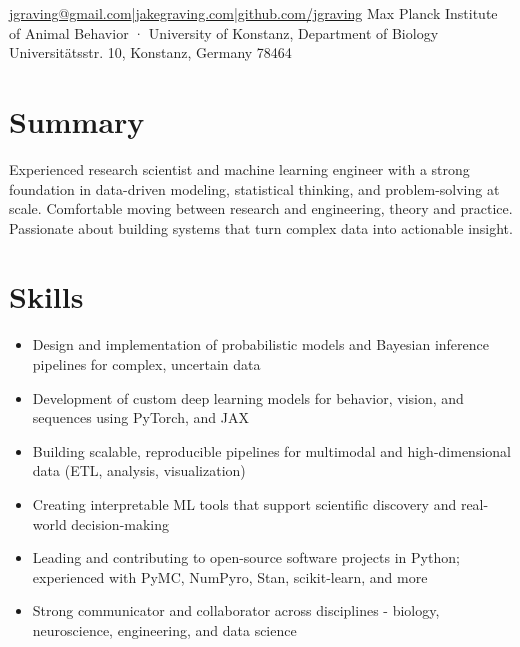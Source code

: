 \documentclass[10pt,a4paper]{article}
\begin{document}
{\href{mailto:jgraving@gmail.com}{jgraving@gmail.com}\enspace |\enspace \href{https://jakegraving.com/}{jakegraving.com}\enspace |\enspace \href{https://github.com/jgraving}{github.com/jgraving}}
{Max Planck Institute of Animal Behavior · University of Konstanz, Department of Biology}
{Universitätsstr. 10, Konstanz, Germany 78464}
\section*{Summary}
Experienced research scientist and machine learning engineer with a strong foundation in data-driven modeling, statistical thinking, and problem-solving at scale. Comfortable moving between research and engineering, theory and practice. Passionate about building systems that turn complex data into actionable insight.\par
\section*{Skills}
\begin{itemize}
\item Design and implementation of probabilistic models and Bayesian inference pipelines for complex, uncertain data
\item Development of custom deep learning models for behavior, vision, and sequences using PyTorch, and JAX
\item Building scalable, reproducible pipelines for multimodal and high-dimensional data (ETL, analysis, visualization)
\item Creating interpretable ML tools that support scientific discovery and real-world decision-making
\item Leading and contributing to open-source software projects in Python; experienced with PyMC, NumPyro, Stan, scikit-learn, and more
\item Strong communicator and collaborator across disciplines - biology, neuroscience, engineering, and data science
\end{itemize}
\end{document}
